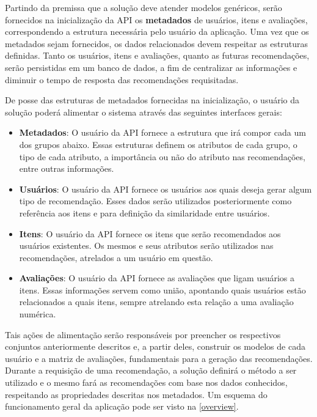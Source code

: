 Partindo da premissa que a solução deve atender modelos genéricos, serão fornecidos na inicialização da API os \textbf{metadados} de usuários, itens e avaliações, correspondendo a estrutura necessária pelo usuário da aplicação. Uma vez que os metadados sejam fornecidos, os dados relacionados devem respeitar as estruturas definidas. Tanto os usuários, itens e avaliações, quanto as futuras recomendações, serão persistidas em um banco de dados, a fim de centralizar as informações e diminuir o tempo de resposta das recomendações requisitadas.

De posse das estruturas de metadados fornecidas na inicialização, o usuário da solução poderá alimentar o sistema através das seguintes interfaces gerais:

\begin{itemize}
	\item \textbf{Metadados}: O usuário da API fornece a estrutura que irá compor cada um dos grupos abaixo. Essas estruturas definem os atributos de cada grupo, o tipo de cada atributo, a importância ou não do atributo nas recomendações, entre outras informações.

	\item \textbf{Usuários}: O usuário da API fornece os usuários aos quais deseja gerar algum tipo de recomendação. Esses dados serão utilizados posteriormente como referência aos itens e para definição da similaridade entre usuários.

	\item \textbf{Itens}: O usuário da API fornece os itens que serão recomendados aos usuários existentes. Os mesmos e seus atributos serão utilizados nas recomendações, atrelados a um usuário em questão.

	\item \textbf{Avaliações}: O usuário da API fornece as avaliações que ligam usuários a itens. Essas informações servem como união, apontando quais usuários estão relacionados a quais itens, sempre atrelando esta relação a uma avaliação numérica.
\end{itemize}

Tais ações de alimentação serão responsáveis por preencher os respectivos conjuntos anteriormente descritos e, a partir deles, construir os modelos de cada usuário e a matriz de avaliações, fundamentais para a geração das recomendações. Durante a requisição de uma recomendação, a solução definirá o método a ser utilizado e o mesmo fará as recomendações com base nos dados conhecidos, respeitando as propriedades descritas nos metadados. Um esquema do funcionamento geral da aplicação pode ser visto na \autoref{overview}.


